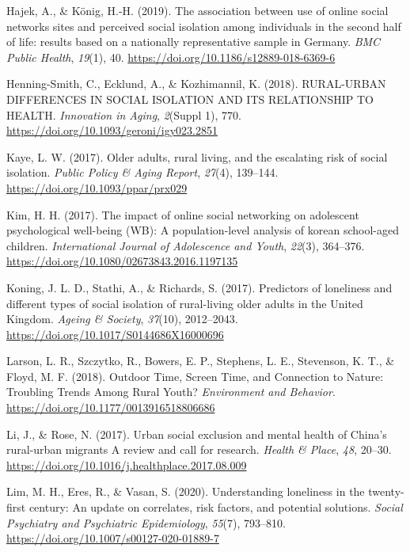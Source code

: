 \documentclass[]{interact}
\theoremstyle{plain}%
\theoremstyle{definition}
\theoremstyle{remark}
\newlength{\cslhangindent}
\newlength{\cslentryspacingunit} %
\newenvironment{CSLReferences}[2] %
 {%
  \setlength{\parindent}{0pt}
  \ifodd #1
  \let\oldpar\par
  \def\par{\hangindent=\cslhangindent\oldpar}
  \fi
  \setlength{\parskip}{#2\cslentryspacingunit}
 }%
 {}
\begin{document}
\begin{CSLReferences}{1}{0}
\leavevmode{}%
Hajek, A., \& König, H.-H. (2019). The association between use of online
social networks sites and perceived social isolation among individuals
in the second half of life: results based on a nationally representative
sample in Germany. \emph{BMC Public Health}, \emph{19}(1), 40.
\url{https://doi.org/10.1186/s12889-018-6369-6}

\leavevmode{}%
Henning-Smith, C., Ecklund, A., \& Kozhimannil, K. (2018). RURAL-URBAN
DIFFERENCES IN SOCIAL ISOLATION AND ITS RELATIONSHIP TO HEALTH.
\emph{Innovation in Aging}, \emph{2}(Suppl 1), 770.
\url{https://doi.org/10.1093/geroni/igy023.2851}

\leavevmode{}%
Kaye, L. W. (2017). Older adults, rural living, and the escalating risk
of social isolation. \emph{Public Policy \& Aging Report}, \emph{27}(4),
139--144. \url{https://doi.org/10.1093/ppar/prx029}

\leavevmode{}%
Kim, H. H. (2017). The impact of online social networking on adolescent
psychological well-being (WB): A population-level analysis of korean
school-aged children. \emph{International Journal of Adolescence and
Youth}, \emph{22}(3), 364--376.
\url{https://doi.org/10.1080/02673843.2016.1197135}

\leavevmode{}%
Koning, J. L. D., Stathi, A., \& Richards, S. (2017). Predictors of
loneliness and different types of social isolation of rural-living older
adults in the United Kingdom. \emph{Ageing \& Society}, \emph{37}(10),
2012--2043. \url{https://doi.org/10.1017/S0144686X16000696}

\leavevmode{}%
Larson, L. R., Szczytko, R., Bowers, E. P., Stephens, L. E., Stevenson,
K. T., \& Floyd, M. F. (2018). Outdoor Time, Screen Time, and Connection
to Nature: Troubling Trends Among Rural Youth? \emph{Environment and
Behavior}. \url{https://doi.org/10.1177/0013916518806686}

\leavevmode{}%
Li, J., \& Rose, N. (2017). Urban social exclusion and mental health of
China's rural-urban migrants {\textendash} A review and call for
research. \emph{Health \& Place}, \emph{48}, 20--30.
\url{https://doi.org/10.1016/j.healthplace.2017.08.009}

\leavevmode{}%
Lim, M. H., Eres, R., \& Vasan, S. (2020). Understanding loneliness in
the twenty-first century: An update on correlates, risk factors, and
potential solutions. \emph{Social Psychiatry and Psychiatric
Epidemiology}, \emph{55}(7), 793--810.
\url{https://doi.org/10.1007/s00127-020-01889-7}


\end{CSLReferences}
\end{document}
